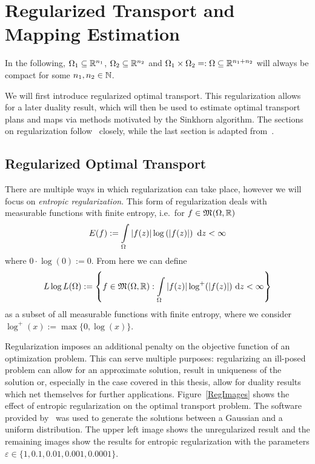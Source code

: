 \chapter[Regularized Transport and Mapping Estimation]{\texorpdfstring{Regularized Transport and \\ Mapping Estimation}{Regularized Transport and Mapping Estimation}}\label{DualPlanEst}

In the following, $\Omega_1 \subseteq \R^{n_1}$, $\Omega_2 \subseteq \R^{n_2}$ and $\Omega_1 \times \Omega_2 =: \Omega \subseteq \R^{n_1 + n_2}$ will always be compact for some $\NinN[n_1, n_2]$.

We will first introduce regularized optimal transport. This regularization allows for a later duality result, which will then be used to estimate optimal transport plans and maps via methods motivated by the Sinkhorn algorithm. The sections on regularization follow\ \cite{Cla2021} closely, while the last section is adapted from\ \cite{Seg2018}.

\section{Regularized Optimal Transport}\label{RegOT}

There are multiple ways in which regularization can take place, however we will focus on \textit{entropic regularization}. This form of regularization deals with measurable functions with finite entropy, i.e.~for $f \in \MF{\Omega}{\R}$
\[ E(f) := \int\limits_\Omega \vert f(z) \vert \log\left( \vert f(z) \vert \right)~\D[z] < \infty \]
where $0 \cdot \log(0) := 0$. From here we can define
\[ \LLL := \left\{ f \in \MF{\Omega}{\R} : \int\limits_\Omega \vert f(z) \vert \log^+(\vert f(z) \vert)~\D[z] < \infty \right\} \]
as a subset of all measurable functions with finite entropy, where we consider $\log^+(x) := \max \{ 0, \log (x) \}$.

Regularization imposes an additional penalty on the objective function of an optimization problem. This can serve multiple purposes: regularizing an ill-posed problem can allow for an approximate solution, result in uniqueness of the solution or, especially in the case covered in this thesis, allow for duality results which net themselves for further applications. Figure~\ref{RegImages} shows the effect of entropic regularization on the optimal transport problem. The software provided by\ \cite{PythonOT} was used to generate the solutions between a Gaussian and a uniform distribution. The upper left image shows the unregularized result and the remaining images show the results for entropic regularization with the parameters $\varepsilon \in \{ 1, 0.1, 0.01, 0.001, 0.0001 \}$.

